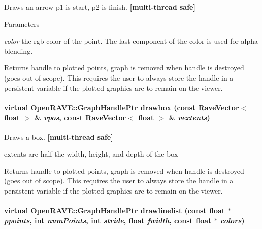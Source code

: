 Draws an arrow p1 is start, p2 is finish. {\bfseries \mbox{[}multi-\/thread safe\mbox{]}} 


\begin{DoxyParams}{Parameters}
\item[{\em color}]the rgb color of the point. The last component of the color is used for alpha blending. \end{DoxyParams}
\begin{DoxyReturn}{Returns}
handle to plotted points, graph is removed when handle is destroyed (goes out of scope). This requires the user to always store the handle in a persistent variable if the plotted graphics are to remain on the viewer. 
\end{DoxyReturn}
\hypertarget{classOpenRAVE_1_1EnvironmentBase_a97ad30e79fe363aa5cbda928b4edee37}{
\paragraph[{drawbox}]{\setlength{\rightskip}{0pt plus 5cm}virtual OpenRAVE::GraphHandlePtr drawbox (const RaveVector$<$ float $>$ \& {\em vpos}, \/  const RaveVector$<$ float $>$ \& {\em vextents})}\hfill}
\label{classOpenRAVE_1_1EnvironmentBase_a97ad30e79fe363aa5cbda928b4edee37}


Draws a box. {\bfseries \mbox{[}multi-\/thread safe\mbox{]}} 

extents are half the width, height, and depth of the box \begin{DoxyReturn}{Returns}
handle to plotted points, graph is removed when handle is destroyed (goes out of scope). This requires the user to always store the handle in a persistent variable if the plotted graphics are to remain on the viewer. 
\end{DoxyReturn}
\hypertarget{classOpenRAVE_1_1EnvironmentBase_a6b14130da89871c94465f94aed704f1e}{
\paragraph[{drawlinelist}]{\setlength{\rightskip}{0pt plus 5cm}virtual OpenRAVE::GraphHandlePtr drawlinelist (const float $\ast$ {\em ppoints}, \/  int {\em numPoints}, \/  int {\em stride}, \/  float {\em fwidth}, \/  const float $\ast$ {\em colors})}\hfill}
\label{classOpenRAVE_1_1EnvironmentBase_a6b14130da89871c94465f94aed704f1e}


